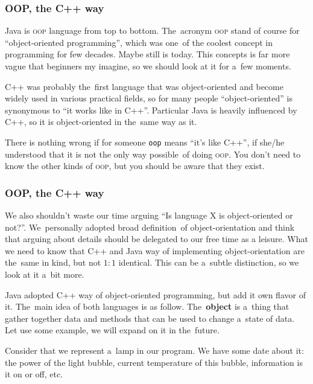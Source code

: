 \documentclass[10pt,t]{beamer}
\begin{document}
\begin{frame}
  \frametitle{OOP, the C++ way}


  Java is
  {\textsc{oop}} language from top to bottom. The~acronym \textsc{oop}
  stand of course for ``object-oriented programming'', which was one~of
  the coolest concept in programming for few decades. Maybe still is today.
  This concepts is far more vague that beginners my imagine, so we should
  look at it for a~few moments.

  C++ was probably the~first language that was object-oriented and become
  widely used in various practical fields, so for many people
  ``object-oriented'' is synonymous to ``it works like in C++''. Particular
  Java is heavily influenced by C++, so it is object-oriented in the~same
  way as it.

  There is nothing wrong if for someone \texttt{oop} means ``it's like
  C++'', if she/he understood that it is not the only way possible~of
  doing \textsc{oop}. You don't need to know the other kinds of
  \textsc{oop}, but you should be aware that they exist.

\end{frame}





\begin{frame}
  \frametitle{OOP, the C++ way}


  We also shouldn't waste our time arguing ``Is language X is
  object-oriented or not?''. We~personally adopted broad definition~of
  object-orientation and think that arguing about details should be
  delegated to our free time as a leisure. What we need to know that C++
  and Java way of implementing object-orientation are the~same in kind, but
  not $1:1$ identical. This can be a~subtle distinction, so we look at it
  a~bit more.

  Java adopted C++ way of object-oriented programming, but add it own flavor
  of it. The~main idea of both languages is as follow. The~\textbf{object}
  is a~thing that gather together data and methods that can be used to
  change a~state of data. Let use some example, we will expand on it
  in the~future.

  Consider that we represent a~lamp in our program. We have some date
  about it: the power of the light bubble, current temperature of this
  bubble, information is it on or off, etc.

\end{frame}
\end{document}

